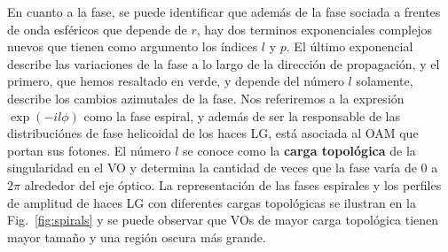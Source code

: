 En cuanto a la fase, se puede identificar que además de la fase
sociada a frentes de onda esféricos que depende de $r$,
hay dos terminos exponenciales complejos nuevos que tienen como
argumento los índices $l$ y $p$. El último exponencial describe las variaciones de
la fase a lo largo de la dirección de propagación, y el primero, que
hemos resaltado en verde, y depende del número $l$ solamente, describe
los cambios azimutales de la fase.
Nos referiremos a la expresión $\exp(-il\phi)$ como la fase espiral, y
además de ser la responsable de las distribuciónes
de fase helicoidal de los haces LG, está asociada al \acrshort{OAM} que
portan sus fotones. El número $l$ se conoce como la \textbf{carga topológica} de
la singularidad en el VO y determina la cantidad de veces que la fase
varía de $0$ a $2\pi$ alrededor del eje óptico. La representación de
las fases espirales y los perfiles de amplitud de haces LG con
diferentes cargas topológicas se ilustran en la Fig.~\ref{fig:spirals}
y se puede
observar que VOs de mayor carga
topológica tienen mayor tamaño y una región oscura más grande.
